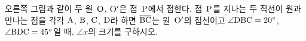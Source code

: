 \noindent\begin{minipage}[t]{0.58\linewidth}\vspace{0pt}\raggedright 오른쪽 그림과 같이 두 원~$\mathrm{O}$, $\mathrm{O'}$은 점~$\mathrm{P}$에서 접한다. 점~$\mathrm{P}$를 지나는 두 직선이 원과 만나는 점을 각각 $\mathrm{A}$, $\mathrm{B}$, $\mathrm{C}$, $\mathrm{D}$라 하면 $\overline{\mathrm{BC}}$는 원~$\mathrm{O'}$의 접선이고 $\angle\mathrm{DBC}=20^\circ$, $\angle\mathrm{BDC}=45^\circ$일 때, $\angle x$의 크기를 구하시오.\end{minipage}\hfill\begin{minipage}[t]{0.4\linewidth}\vspace{0pt}\centering \resizebox{\ifdim\width>\linewidth\linewidth\else\width\fi}{!}{}\end{minipage}\par
